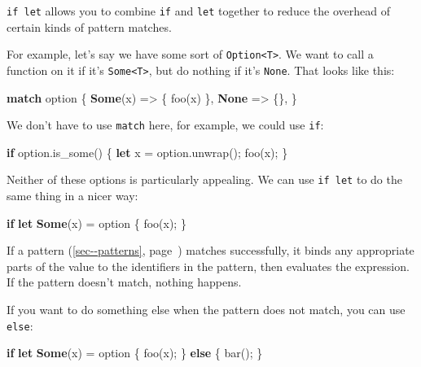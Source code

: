 \documentclass[a4paper,]{book}
\renewcommand*{\hyperref}[2][\ar]{%
  \def\ar{#2}%
  #2 (\autoref{#1}, page~\pageref{#1})}
\newenvironment{Shaded}{\begin{snugshade}}{\end{snugshade}}
\newcommand{\KeywordTok}[1]{\textcolor[rgb]{0.13,0.29,0.53}{\textbf{{#1}}}}
\newcommand{\NormalTok}[1]{{#1}}
\begin{document}
\texttt{if\ let} allows you to combine \texttt{if} and \texttt{let}
together to reduce the overhead of certain kinds of pattern matches.

For example, let's say we have some sort of
\texttt{Option\textless{}T\textgreater{}}. We want to call a function on
it if it's \texttt{Some\textless{}T\textgreater{}}, but do nothing if
it's \texttt{None}. That looks like this:

\begin{Shaded}
\begin{Highlighting}[]
\KeywordTok{match} \NormalTok{option \{}
    \KeywordTok{Some}\NormalTok{(x) => \{ foo(x) \},}
    \KeywordTok{None} \NormalTok{=> \{\},}
\NormalTok{\}}
\end{Highlighting}
\end{Shaded}

We don't have to use \texttt{match} here, for example, we could use
\texttt{if}:

\begin{Shaded}
\begin{Highlighting}[]
\KeywordTok{if} \NormalTok{option.is_some() \{}
    \KeywordTok{let} \NormalTok{x = option.unwrap();}
    \NormalTok{foo(x);}
\NormalTok{\}}
\end{Highlighting}
\end{Shaded}

Neither of these options is particularly appealing. We can use
\texttt{if\ let} to do the same thing in a nicer way:

\begin{Shaded}
\begin{Highlighting}[]
\KeywordTok{if} \KeywordTok{let} \KeywordTok{Some}\NormalTok{(x) = option \{}
    \NormalTok{foo(x);}
\NormalTok{\}}
\end{Highlighting}
\end{Shaded}

If a \hyperref[sec--patterns]{pattern} matches successfully, it binds
any appropriate parts of the value to the identifiers in the pattern,
then evaluates the expression. If the pattern doesn't match, nothing
happens.

If you want to do something else when the pattern does not match, you
can use \texttt{else}:

\begin{Shaded}
\begin{Highlighting}[]
\KeywordTok{if} \KeywordTok{let} \KeywordTok{Some}\NormalTok{(x) = option \{}
    \NormalTok{foo(x);}
\NormalTok{\} }\KeywordTok{else} \NormalTok{\{}
    \NormalTok{bar();}
\NormalTok{\}}
\end{Highlighting}
\end{Shaded}
\end{document}
